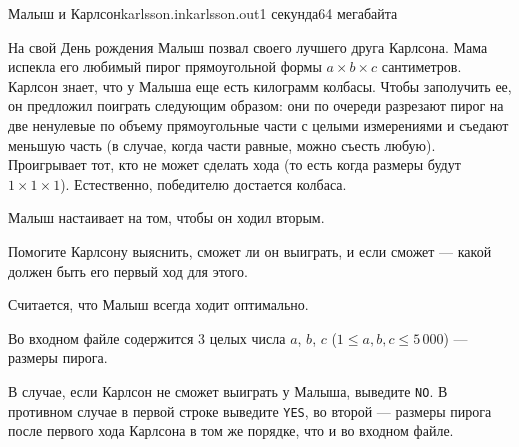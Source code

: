 \begin{problem}{Малыш и Карлсон}{karlsson.in}{karlsson.out}{1 секунда}{64 мегабайта}

На свой День рождения Малыш позвал своего лучшего друга Карлсона.
Мама испекла его любимый пирог прямоугольной формы $a \times b \times c$ сантиметров.
Карлсон знает, что у Малыша еще есть килограмм колбасы. Чтобы заполучить ее,
он предложил поиграть следующим образом: они по очереди разрезают пирог
на две ненулевые по объему прямоугольные части с целыми измерениями и съедают меньшую часть
(в случае, когда части равные, можно съесть любую).
Проигрывает тот, кто не может сделать хода (то есть когда размеры будут $1 \times 1 \times 1$).
Естественно, победителю достается колбаса.

Малыш настаивает на том, чтобы он ходил вторым.

Помогите Карлсону выяснить, сможет ли он выиграть, и если сможет --- какой должен быть
его первый ход для этого.

Считается, что Малыш всегда ходит оптимально.

\InputFile

Во входном файле содержится 3 целых числа $a$, $b$, $c$ ($1 \le a, b, c \le 5\,000$) ---
размеры пирога.

\OutputFile

В случае, если Карлсон не сможет выиграть у Малыша, выведите \texttt{NO}.
В противном случае в первой строке выведите \texttt{YES}, во второй --- размеры пирога
после первого хода Карлсона в том же порядке, что и во входном файле.

\Examples

\begin{example}%
%
%
\end{example}

\end{problem}

